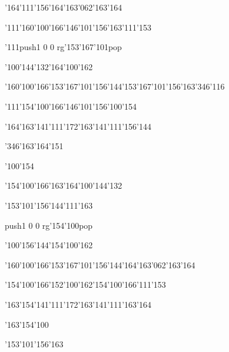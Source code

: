 \null\vfill\ipa\centerline{\enskip\enskip\enskip\enskip\char'164\char'111\char'156\enskip\char'164\char'163\char'062\char'163\char'164}\medskip\centerline{\enskip\char'111\enskip\char'160\char'100\char'166\enskip\char'146\char'101\char'156\char'163\enskip\char'111\char'153}\medskip\centerline{\enskip\char'111\enskip\pdfcolorstack\match push{1 0 0 rg}\char'153\char'167\char'101\pdfcolorstack\match pop{}\enskip\enskip\enskip\enskip\enskip\enskip}\medskip\centerline{\enskip\enskip\enskip\enskip\char'100\char'144\char'132\enskip\enskip\enskip\enskip\char'164\char'100\char'162}\medskip\centerline{\enskip\char'160\char'100\char'166\enskip\char'153\char'167\char'101\char'156\char'144\enskip\char'153\char'167\char'101\char'156\char'163\enskip\char'346\char'116}\medskip\centerline{\enskip\char'111\enskip\char'154\char'100\char'166\enskip\char'146\char'101\char'156\enskip\enskip\enskip\enskip\enskip\char'100\char'154}\medskip\centerline{\enskip\char'164\char'163\char'141\char'111\char'172\enskip\enskip\enskip\enskip\char'163\char'141\char'111\char'156\char'144\enskip\enskip\enskip}\medskip\centerline{\enskip\char'346\enskip\char'163\char'164\char'151\enskip\enskip\enskip\enskip\enskip\enskip}\medskip\centerline{\enskip\char'100\char'154\enskip\enskip\enskip\enskip\enskip\enskip\enskip\enskip\enskip\enskip\enskip\enskip}\medskip\vfill\footline{\hfil\tt\folio\hfil}\eject
\null\vfill\ipa\centerline{\enskip\enskip\enskip\enskip\char'154\char'100\char'166\enskip\char'163\char'164\char'100\char'144\char'132}\medskip\centerline{\enskip\enskip\enskip\enskip\enskip\enskip\enskip\char'153\char'101\char'156\char'144\enskip\char'111\char'163}\medskip\centerline{\enskip\enskip\enskip\enskip\enskip\enskip\enskip\pdfcolorstack\match push{1 0 0 rg}\char'154\char'100\pdfcolorstack\match pop{}\enskip\enskip\enskip}\medskip\centerline{\enskip\enskip\enskip\enskip\char'100\char'156\char'144\enskip\enskip\enskip\enskip\char'154\char'100\char'162}\medskip\centerline{\enskip\char'160\char'100\char'166\enskip\char'153\char'167\char'101\char'156\char'144\enskip\char'164\char'163\char'062\char'163\char'164\enskip\enskip\enskip}\medskip\centerline{\enskip\enskip\enskip\char'154\char'100\char'166\enskip\char'152\char'100\char'162\enskip\char'154\char'100\char'166\enskip\char'111\char'153}\medskip\centerline{\enskip\char'163\char'154\char'141\char'111\char'172\enskip\enskip\enskip\enskip\char'163\char'141\char'111\char'163\char'164\enskip\enskip\enskip}\medskip\centerline{\enskip\enskip\enskip\char'163\char'154\char'100\enskip\enskip\enskip\enskip\enskip\enskip}\medskip\centerline{\enskip\enskip\enskip\enskip\enskip\enskip\enskip\enskip\enskip\enskip\enskip\char'153\char'101\char'156\char'163}\medskip\vfill\footline{\hfil\tt\folio\hfil}\eject
